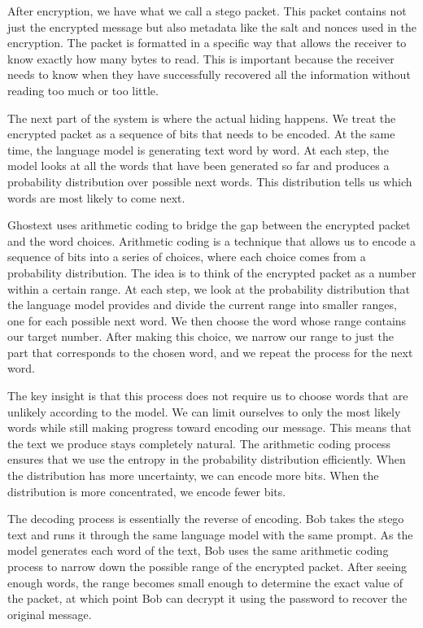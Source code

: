 \documentclass[sigconf,review,anonymous]{acmart}
\begin{document}
{After encryption, we have what we call a stego packet. This packet contains not just the encrypted message but also metadata like the salt and nonces used in the encryption. The packet is formatted in a specific way that allows the receiver to know exactly how many bytes to read. This is important because the receiver needs to know when they have successfully recovered all the information without reading too much or too little.

The next part of the system is where the actual hiding happens. We treat the encrypted packet as a sequence of bits that needs to be encoded. At the same time, the language model is generating text word by word. At each step, the model looks at all the words that have been generated so far and produces a probability distribution over possible next words. This distribution tells us which words are most likely to come next.

Ghostext uses arithmetic coding to bridge the gap between the encrypted packet and the word choices. Arithmetic coding is a technique that allows us to encode a sequence of bits into a series of choices, where each choice comes from a probability distribution. The idea is to think of the encrypted packet as a number within a certain range. At each step, we look at the probability distribution that the language model provides and divide the current range into smaller ranges, one for each possible next word. We then choose the word whose range contains our target number. After making this choice, we narrow our range to just the part that corresponds to the chosen word, and we repeat the process for the next word.

The key insight is that this process does not require us to choose words that are unlikely according to the model. We can limit ourselves to only the most likely words while still making progress toward encoding our message. This means that the text we produce stays completely natural. The arithmetic coding process ensures that we use the entropy in the probability distribution efficiently. When the distribution has more uncertainty, we can encode more bits. When the distribution is more concentrated, we encode fewer bits.

The decoding process is essentially the reverse of encoding. Bob takes the stego text and runs it through the same language model with the same prompt. As the model generates each word of the text, Bob uses the same arithmetic coding process to narrow down the possible range of the encrypted packet. After seeing enough words, the range becomes small enough to determine the exact value of the packet, at which point Bob can decrypt it using the password to recover the original message.

}
\end{document}
